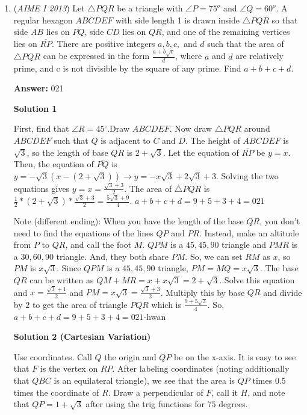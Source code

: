 \begin{enumerate}
 


	\item (\textit{AIME I 2013}) Let $\bigtriangleup PQR$ be a triangle with $\angle P = 75^o$ and $\angle Q = 60^o$. A regular hexagon $ABCDEF$ with side length 1 is drawn inside $\triangle PQR$ so that side $\overline{AB}$ lies on $\overline{PQ}$, side $\overline{CD}$ lies on $\overline{QR}$, and one of the remaining vertices lies on $\overline{RP}$. There are positive integers $a, b, c,$ and $d$ such that the area of $\triangle PQR$ can be expressed in the form $\frac{a+b\sqrt{c}}{d}$, where $a$ and $d$ are relatively prime, and c is not divisible by the square of any prime. Find $a+b+c+d$.


 
 \textbf{Answer: }021



\textbf{Solution 1}

First, find that $\angle R = 45^\circ$.Draw $ABCDEF$. Now draw $\bigtriangleup PQR$ around $ABCDEF$ such that $Q$ is adjacent to $C$ and $D$. The height of $ABCDEF$ is $\sqrt{3}$, so the length of base $QR$ is $2+\sqrt{3}$. Let the equation of $\overline{RP}$ be $y = x$. Then, the equation of $\overline{PQ}$ is $y = -\sqrt{3} (x - (2+\sqrt{3})) \to y = -x\sqrt{3} + 2\sqrt{3} + 3$. Solving the two equations gives $y = x = \frac{\sqrt{3} + 3}{2}$. The area of $\bigtriangleup PQR$ is $\frac{1}{2} * (2 + \sqrt{3}) * \frac{\sqrt{3} + 3}{2} = \frac{5\sqrt{3} + 9}{4}$. $a + b + c + d = 9 + 5 + 3 + 4 = \boxed{021}$

 


 Note (different ending): When you have the length of the base $QR$, you don't need to find the equations of the lines $QP$ and $PR$. Instead, make an altitude from $P$ to $QR$, and call the foot $M$. $QPM$ is a $45, 45, 90$ triangle and $PMR$ is a $30, 60, 90$ triangle. And, they both share $PM$. So, we can set $RM$ as $x$, so $PM$ is $x\sqrt{3}$. Since $QPM$ is a $45, 45, 90$ triangle, $PM=MQ=x\sqrt{3}$. The base $QR$ can be written as $QM+MR=x+x\sqrt{3}=2+\sqrt{3}$. Solve this equation and $x=\frac{\sqrt{3}+1}{2}$ and $PM=x\sqrt{3}=\frac{\sqrt{3}+3}{2}$. Multiply this by base $QR$ and divide by $2$ to get the area of triangle $PQR$ which is $\frac{9+5\sqrt{3}}{4}$. So, $a + b + c + d = 9 + 5 + 3 + 4 = \boxed{021}$-hwan

 



\textbf{Solution 2 (Cartesian Variation)}

Use coordinates. Call $Q$ the origin and $QP$ be on the x-axis. It is easy to see that $F$ is the vertex on $RP$. After labeling coordinates (noting additionally that $QBC$ is an equilateral triangle), we see that the area is $QP$ times $0.5$ times the coordinate of $R$. Draw a perpendicular of $F$, call it $H$, and note that $QP = 1 + \sqrt{3}$ after using the trig functions for $75$ degrees.


\end{enumerate}
